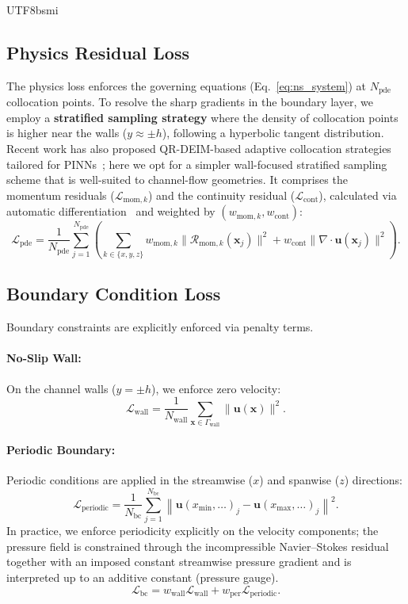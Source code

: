 \documentclass[master]{NTHUthesis}
\begin{document}
\begin{CJK*}{UTF8}{bsmi}
\subsection{Physics Residual Loss}
The physics loss enforces the governing equations (Eq.~\ref{eq:ns_system}) at $N_{\text{pde}}$ collocation points.
To resolve the sharp gradients in the boundary layer, we employ a \textbf{stratified sampling strategy} where the density of collocation points is higher near the walls ($y \approx \pm h$), following a hyperbolic tangent distribution. Recent work has also proposed QR-DEIM-based adaptive collocation strategies tailored for PINNs~\cite{celaya2025adaptive}; here we opt for a simpler wall-focused stratified sampling scheme that is well-suited to channel-flow geometries.
It comprises the momentum residuals ($\mathcal{L}_{\text{mom},k}$) and the continuity residual ($\mathcal{L}_{\text{cont}}$), calculated via automatic differentiation~\cite{Raissi2019JCP} and weighted by $(w_{\text{mom},k}, w_{\text{cont}})$:
\begin{equation}
    \label{eq:pde_loss}
    \mathcal{L}_{\text{pde}} = \frac{1}{N_{\text{pde}}} \sum_{j=1}^{N_{\text{pde}}} \left( \sum_{k \in \{x,y,z\}} w_{\text{mom}, k}\|\mathcal{R}_{\text{mom}, k}(\mathbf{x}_j)\|^2 + w_{\text{cont}}\|\nabla \cdot \mathbf{u}(\mathbf{x}_j)\|^2 \right).
\end{equation}

\subsection{Boundary Condition Loss}
Boundary constraints are explicitly enforced via penalty terms.
\paragraph{No-Slip Wall:} On the channel walls ($y = \pm h$), we enforce zero velocity:
\begin{equation}
    \mathcal{L}_{\text{wall}} = \frac{1}{N_{\text{wall}}} \sum_{\mathbf{x} \in \Gamma_{\text{wall}}} \|\mathbf{u}(\mathbf{x})\|^2.
\end{equation}
\paragraph{Periodic Boundary:} Periodic conditions are applied in the streamwise ($x$) and spanwise ($z$) directions:
\begin{equation}
    \mathcal{L}_{\text{periodic}} = \frac{1}{N_{\text{bc}}} \sum_{j=1}^{N_{\text{bc}}} \left\| \mathbf{u}(x_{\min}, \dots)_j - \mathbf{u}(x_{\max}, \dots)_j \right\|^2.
\end{equation}
In practice, we enforce periodicity explicitly on the velocity components; the pressure field is constrained through the incompressible Navier--Stokes residual together with an imposed constant streamwise pressure gradient and is interpreted up to an additive constant (pressure gauge).
\begin{equation}
    \mathcal{L}_{\text{bc}} = w_{\text{wall}}\mathcal{L}_{\text{wall}} + w_{\text{per}}\mathcal{L}_{\text{periodic}}.
\end{equation}


\end{CJK*}
\end{document}
